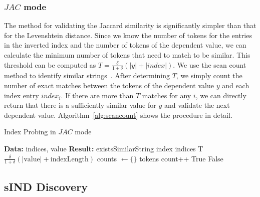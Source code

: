 \subsubsection{$JAC$ mode}
The method for validating the Jaccard similarity is significantly simpler than that for the Levenshtein distance.
Since we know the number of tokens for the entries in the inverted index and the number of tokens of the dependent value, we can calculate the minimum number of tokens that need to match to be similar.
This threshold can be computed as $T = \frac{\delta}{1+\delta}(|y|+|index|)$.
We use the scan count method to identify similar strings~\cite{StringSimSurvey}.
After determining $T$, we simply count the number of exact matches between the tokens of the dependent value $y$ and each index entry $index_i$.
If there are more than $T$ matches for any $i$, we can directly return that there is a sufficiently similar value for $y$ and validate the next dependent value.
Algorithm~\ref{alg:scancount} shows the procedure in detail.

\begin{algorithm}
\caption{Index Probing in $JAC$ mode}
\label{alg:scancount}
\begin{algorithmic}[1]
\begin{itshape}
\Statex \textbf{Data:} indices, value
\Statex \textbf{Result:} existsSimilarString
        \State index \mgets{} indices
        \State T \mgets{} $\frac{\delta}{1+\delta}(|\text{value}|+\text{indexLength})$
        \State counts $\gets \{\}$
        \State tokens \mgets{} 
                \State count++
                    \State \Return True
                \EndIf
            \EndFor
        \EndFor
    \EndFor
    \State \Return False
\EndFunction
\end{itshape}
\end{algorithmic}
\end{algorithm}



\subsection{sIND Discovery}%
\label{subsection:sind:combination}

